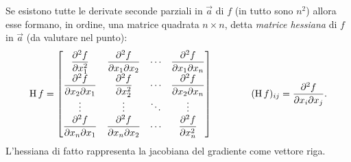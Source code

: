 Se esistono tutte le derivate seconde parziali in $\vec a$ di $f$ (in tutto sono $n^2$) allora esse formano, in ordine, una matrice quadrata $n\times n$, detta \emph{matrice hessiana} di $f$ in $\vec a$ (da valutare nel punto):
\[
\operatorname{H} f=\begin{bmatrix}
\dfrac{\partial^2f}{\partial x_1^2}		&\dfrac{\partial^2f}{\partial x_1\partial x_2}	&\cdots 	&\dfrac{\partial^2f}{\partial x_1\partial x_n}\\
\dfrac{\partial^2f}{\partial x_2\partial x_1}	&\dfrac{\partial^2f}{\partial x_2^2}		&\cdots 	&\dfrac{\partial^2f}{\partial x_2\partial x_n}\\
\vdots 							&\vdots 							&\ddots 	&\vdots\\
\dfrac{\partial^2f}{\partial x_n\partial x_1}	&\dfrac{\partial^2f}{\partial x_n\partial x_2}	&\cdots 	&\dfrac{\partial^2f}{\partial x_n^2}
\end{bmatrix}\qquad\qquad(\operatorname{H} f)_{ij}=\dfrac{\partial^2f}{\partial x_i\partial x_j}.
\]
L'hessiana di fatto rappresenta la jacobiana del gradiente come vettore riga.


